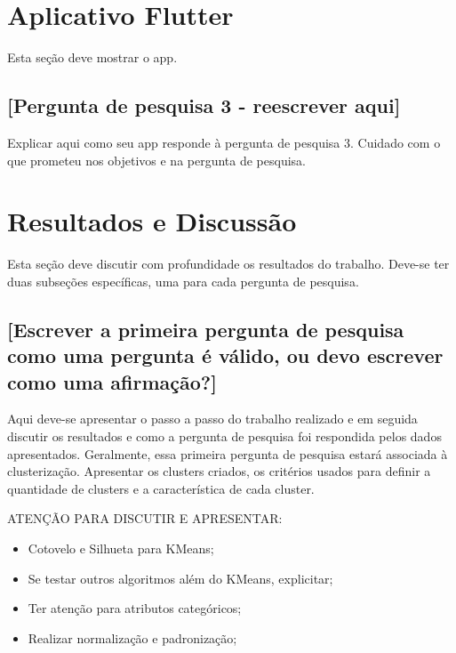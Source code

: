 \documentclass[12pt,a4paper]{article}
\begin{document}
\section{Aplicativo Flutter}\label{sec:aplicativo}

Esta seção deve mostrar o app.

\subsection{[Pergunta de pesquisa 3 - reescrever aqui]}\label{sec:pergunta-3}

Explicar aqui como seu app responde à pergunta de pesquisa 3. Cuidado com o que
prometeu nos objetivos e na pergunta de pesquisa.

\section{Resultados e Discussão}\label{sec:resultados}

Esta seção deve discutir com profundidade os resultados do trabalho. Deve-se ter
duas subseções específicas, uma para cada pergunta de pesquisa.

\subsection{[Escrever a primeira pergunta de pesquisa como uma pergunta é válido,
  ou devo escrever como uma afirmação?]}\label{sec:primeira-pergunta}

Aqui deve-se apresentar o passo a passo do trabalho realizado e em seguida
discutir os resultados e como a pergunta de pesquisa foi respondida pelos dados
apresentados. Geralmente, essa primeira pergunta de pesquisa estará associada à
clusterização. Apresentar os clusters criados, os critérios usados para definir
a quantidade de clusters e a característica de cada cluster.

ATENÇÃO PARA DISCUTIR E APRESENTAR:

\begin{itemize}
  \item Cotovelo e Silhueta para KMeans;
  \item Se testar outros algoritmos além do KMeans, explicitar;
  \item Ter atenção para atributos categóricos;
  \item Realizar normalização e padronização;
\end{itemize}
\end{document}
